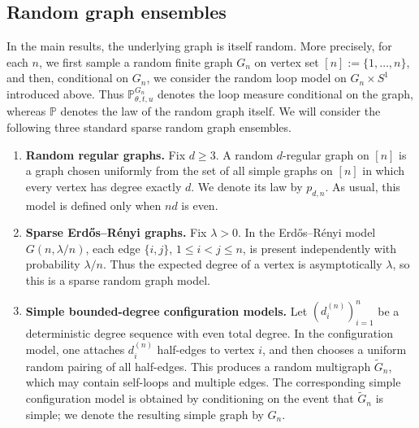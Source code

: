 \documentclass[11pt]{article}
\theoremstyle{remark}
\theoremstyle{plain}
\newcommand{\Pbb}{\mathbb{P}}
\newcommand{\1}{\mathbbm{1}}
\begin{document}
\subsection{Random graph ensembles}

In the main results, the underlying graph is itself random. More precisely, for each \(n\),
we first sample a random finite graph \(G_n\) on vertex set \([n]:=\{1,\dots,n\}\), and then,
conditional on \(G_n\), we consider the random loop model on \(G_n\times S^1\) introduced
above. Thus \(\Pbb^{G_n}_{\theta,t,u}\) denotes the loop measure conditional on the graph,
whereas \(\Pbb\) denotes the law of the random graph itself.
We will consider the following three standard sparse random graph ensembles.

\begin{enumerate}[label=\textnormal{(\roman*)}]
    \item \textbf{Random regular graphs.}
    Fix \(d\ge 3\). A random \(d\)-regular graph on \([n]\) is a graph chosen uniformly from
    the set of all simple graphs on \([n]\) in which every vertex has degree exactly \(d\).
    We denote its law by \(p_{d,n}\). As usual, this model is defined only when \(nd\) is even.

    \item \textbf{Sparse Erd\H{o}s--R\'enyi graphs.}
    Fix \(\lambda>0\). In the Erd\H{o}s--R\'enyi model \(G(n,\lambda/n)\), each edge
    \(\{i,j\}\), \(1\le i<j\le n\), is present independently with probability \(\lambda/n\).
    Thus the expected degree of a vertex is asymptotically \(\lambda\), so this is a sparse
    random graph model.

    \item \textbf{Simple bounded-degree configuration models.}
    Let \((d_i^{(n)})_{i=1}^n\) be a deterministic degree sequence with even total degree.
    In the configuration model, one attaches \(d_i^{(n)}\) half-edges to vertex \(i\), and then
    chooses a uniform random pairing of all half-edges. This produces a random multigraph
    \(\widetilde G_n\), which may contain self-loops and multiple edges. The corresponding
    simple configuration model is obtained by conditioning on the event that
    \(\widetilde G_n\) is simple; we denote the resulting simple graph by \(G_n\).
\end{enumerate}
\end{document}
